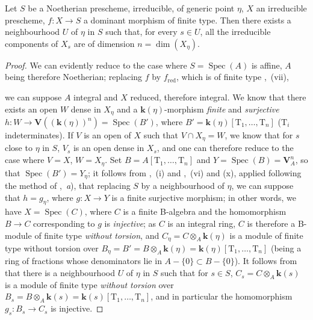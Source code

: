 \begin{corollary}[9.5.6]
\label{IV.9.5.6}
Let $S$ be a Noetherian prescheme, irreducible, of generic point $\eta$, $X$ an irreducible prescheme, $f:X\to S$ a dominant morphism of finite type.
Then there exists a neighbourhood $U$ of $\eta$ in $S$ such that, for every $s\in U$, all the irreducible components of $X_s$ are of dimension $n=\dim(X_\eta)$.
\end{corollary}

\begin{proof}
We can evidently reduce to the case where $S=\operatorname{Spec}(A)$ is affine, $A$ being therefore Noetherian; replacing $f$ by $f_{\mathrm{red}}$, which is of finite type ,~(vii),


we can suppose $A$ integral and $X$ reduced, therefore integral.
We know  that there exists an open $W$ dense in $X_\eta$ and a $\boldsymbol{k}(\eta)$-morphism \emph{finite} and \emph{surjective} $h:W\to\mathbf{V}((\boldsymbol{k}(\eta))^n)=\operatorname{Spec}(B')$, where $B'=\boldsymbol{k}(\eta)[\mathrm{T}_1,\ldots,\mathrm{T}_n]$ ($\mathrm{T}_i$ indeterminates).
If $V$ is an open of $X$ such that $V\cap X_\eta=W$, we know  that for $s$ close to $\eta$ in $S$, $V_s$ is an open dense in $X_s$, and one can therefore  reduce to the case where $V=X$, $W=X_\eta$.
Set $B=A[\mathrm{T}_1,\ldots,\mathrm{T}_n]$ and $Y=\operatorname{Spec}(B)=\mathbf{V}_A^n$, so that $\operatorname{Spec}(B')=Y_\eta$; it follows from ,~(i) and ,~(vi) and (x), applied following the method of ,~\emph{a}), that replacing $S$ by a neighbourhood of $\eta$, we can suppose that $h=g_\eta$, where $g:X\to Y$ is a finite surjective morphism; in other words, we have $X=\operatorname{Spec}(C)$, where $C$ is a finite B-algebra and the homomorphism $B\to C$ corresponding to $g$ is \emph{injective}; as $C$ is an integral ring, $C$ is therefore a B-module of finite type \emph{without torsion}, and $C_\eta=C\otimes_A\boldsymbol{k}(\eta)$ is a module of finite type without torsion over $B_\eta=B'=B\otimes_A\boldsymbol{k}(\eta)=\boldsymbol{k}(\eta)[\mathrm{T}_1,\ldots,\mathrm{T}_n]$ (being a ring of fractions whose denominators lie in $A-\{0\}\subset B-\{0\}$).
It follows from  that there is a neighbourhood $U$ of $\eta$ in $S$ such that for $s\in S$, $C_s=C\otimes_A\boldsymbol{k}(s)$ is a module of finite type \emph{without torsion} over $B_s=B\otimes_A\boldsymbol{k}(s)=\boldsymbol{k}(s)[\mathrm{T}_1,\ldots,\mathrm{T}_n]$, and in particular the homomorphism $g_s:B_s\to C_s$ is injective.

\end{proof}
